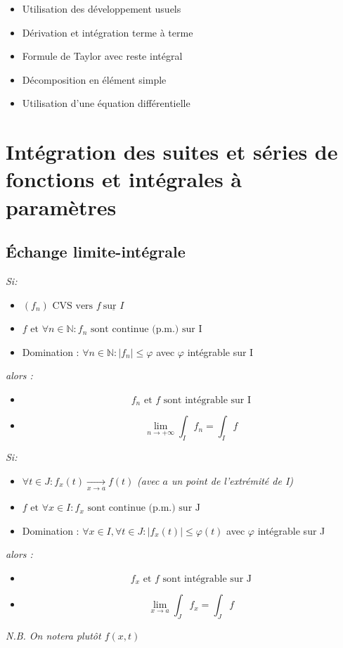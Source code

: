 \documentclass[a4paper,12pt]{report}
\newcommand{\Thm}[2]{\begin{tcolorbox}[colback=white,colframe=Red!60, title=Théorème : #1]#2\end{tcolorbox}}
\newcommand{\Methode}[2]{\begin{tcolorbox}[colback=white, title=Méthode :  #1]#2\end{tcolorbox}}
\def\N{\mathbb{N}}
\begin{document}
\Methode{Détermination du DSE}{
\begin{itemize}
\item[] Utilisation des développement usuels
\item[] Dérivation et intégration terme à terme
\item[] Formule de Taylor avec reste intégral
\item[] Décomposition en élément simple
\item[] Utilisation d'une équation différentielle
\end{itemize}
}

\section{Intégration des suites et séries de fonctions et intégrales à paramètres}
\subsection{Échange limite-intégrale}
\Thm{de convergence dominée}{
\textit{Si:}
\begin{itemize}
  \item[] \( (f_n) \text{ CVS vers } f\ \underline{\text{sur } I}\)
  \item[] \( f \text{ et } \forall n \in \N : f_n \text{ sont continue (p.m.) sur I}\)
  \item[] Domination : \(\forall n \in \N: |f_n|\leq\varphi\) avec $\varphi$ intégrable sur I
\end{itemize}
\textit{alors :}
\begin{itemize}
    \item[] \[\text{$f_n$ et $f$ sont intégrable sur I}\]
    \item[] \[\lim_{n\to+\infty} \int_I f_n = \int_I f\]
\end{itemize}
}

\Thm{de convergence dominée (à paramètre continue)}{
\textit{Si:}
\begin{itemize}
  \item[] \( \forall t \in J : f_x(t)\xrightarrow[x\to a]{} f(t)\) \textit{(avec $a$ un point de l'extrémité de I)}
  \item[] \( f \text{ et } \forall x \in I : f_x \text{ sont continue (p.m.) sur J}\)
  \item[] Domination : \(\forall x \in I, \forall t \in J :|f_x(t)|\leq\varphi(t)\) avec $\varphi$ intégrable sur J
\end{itemize}
\textit{alors :}
\begin{itemize}
    \item[] \[\text{$f_x$ et $f$ sont intégrable sur J}\]
    \item[] \[\lim_{x\to a} \int_J f_x = \int_J f\]
\end{itemize}
\textit{N.B. On notera plutôt $f(x,t)$}
}
\end{document}
